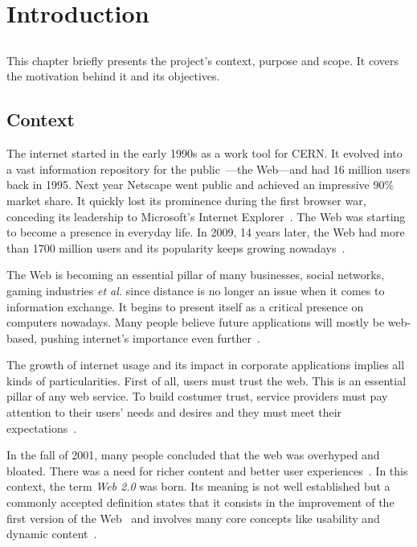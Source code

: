 \chapter{Introduction} %
\label{cha:introduction}

\section*{} %
This chapter briefly presents the project's context, purpose and scope. It covers the motivation behind it and its objectives.%


\section{Context} %
\label{sec:context}
The internet started in the early 1990s as a work tool for CERN. It evolved into a vast information repository for the public~\cite{teaching_webdev_web20}---the Web---and had 16 million users back in 1995. Next year Netscape went public and achieved an impressive 90\% market share. It quickly lost its prominence during the first browser war, conceding its leadership to Microsoft's Internet Explorer~\cite{browser_wars}. The Web was starting to become a presence in everyday life. In 2009, 14 years later, the Web had more than 1700 million users and its popularity keeps growing nowadays~\cite{internet_stats}.

The Web is becoming an essential pillar of many businesses, social networks, gaming industries \textit{et al.} since distance is no longer an issue when it comes to information exchange.  It begins to present itself as a critical presence on computers nowadays. Many people believe future applications will mostly be web-based, pushing internet's importance even further~\cite{browser_application_platform}.

The growth of internet usage and its impact in corporate applications implies all kinds of particularities. First of all, users must trust the web. This is an essential pillar of any web service. To build costumer trust, service providers must pay attention to their users' needs and desires and they must meet their expectations~\cite{trust_semantic_web}. 

In the fall of 2001, many people concluded that the web was overhyped and bloated. There was a need for richer content and better user experiences~\cite{oreilly_web20}. In this context, the term \textit{Web 2.0} was born. Its meaning is not well established but a commonly accepted definition states that it consists in the improvement of the first version of the Web~\cite{rubyonrails_tutorial} and involves many core concepts like usability and dynamic content~\cite{what_is_web20}.

